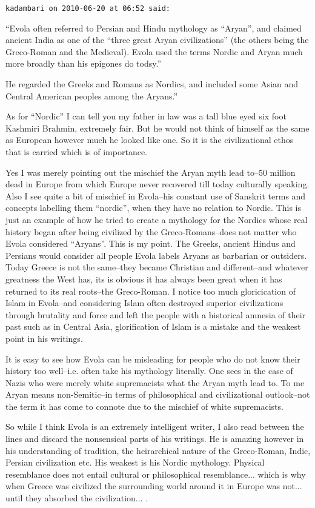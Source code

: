\begin{footnotesize}
\begin{sffamily}
\hfill

\texttt{kadambari on 2010-06-20 at 06:52 said:}

``Evola often referred to Persian and Hindu mythology as ``Aryan'', and claimed ancient India as one of the ``three great Aryan civilizations'' (the others being the Greco-Roman and the Medieval). Evola used the terms Nordic and Aryan much more broadly than his epigones do todsy.''

He regarded the Greeks and Romans as Nordics, and included some Asian and Central American peoples among the Aryans.''

As for ``Nordic'' I can tell you my father in law was a tall blue eyed six foot Kashmiri Brahmin, extremely fair. But he would not think of himself as the same as European however much he looked like one. So it is the civilizational ethos that is carried which is of importance.

Yes I was merely pointing out the mischief the Aryan myth lead to--50 million dead in Europe from which Europe never recovered till today culturally speaking. Also I see quite a bit of mischief in Evola--his constant use of Sanskrit terms and concepts labelling them ``nordic'', when they have no relation to Nordic. This is just an example of how he tried to create a mythology for the Nordics whose real history began after being civilized by the Greco-Romans--does not matter who Evola considered ``Aryans''. This is my point. The Greeks, ancient Hindus and Persians would consider all people Evola labels Aryans as barbarian or outsiders. Today Greece is not the same--they became Christian and different--and whatever greatness the West has, its is obvious it has always been great when it has returned to its real roots--the Greco-Roman. I notice too much gloricication of Islam in Evola--and considering Islam often destroyed superior civilizations through brutality and force and left the people with a historical amnesia of their past such as in Central Asia, glorification of Islam is a mistake and the weakest point in his writings.

It is easy to see how Evola can be misleading for people who do not know their history too well--i.e. often take his mythology literally. One sees in the case of Nazis who were merely white supremacists what the Aryan myth lead to. To me Aryan means non-Semitic--in terms of philosophical and civilizational outlook--not the term it has come to connote due to the mischief of white supremacists.

So while I think Evola is an extremely intelligent writer, I also read between the lines and discard the nonsensical parts of his writings. He is amazing however in his understanding of tradition, the heirarchical nature of the Greco-Roman, Indic, Persian civilization etc. His weakest is his Nordic mythology. Physical resemblance does not entail cultural or philosophical resemblance... which is why when Greece was civilized the surrounding world around it in Europe was not... until they absorbed the civilization... .


\end{sffamily}
\end{footnotesize}
